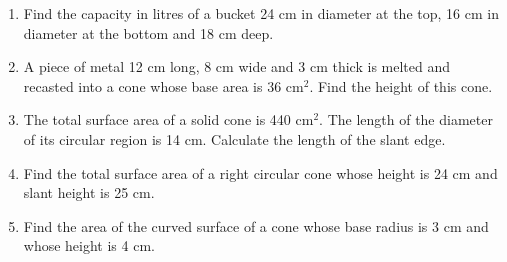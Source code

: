 \begin{enumerate}
	\item Find the capacity in litres of a bucket 24 cm in diameter at the top, 16 cm in diameter at the bottom and 18 cm deep.
	
	\item A piece of metal 12 cm long, 8 cm wide and 3 cm thick is melted and recasted into a cone whose base area is 36 cm$^2$. Find the height of this cone.
	
	\item The total surface area of a solid cone is 440 cm$^2$. The length of the diameter of its circular region is 14 cm. Calculate the length of the slant edge.
	
	\item Find the total surface area of a right circular cone whose height is 24 cm and slant height is 25 cm.
	
	\item Find the area of the curved surface of a cone whose base radius is 3 cm and whose height is 4 cm.

\end{enumerate}	
	
	
	
	
